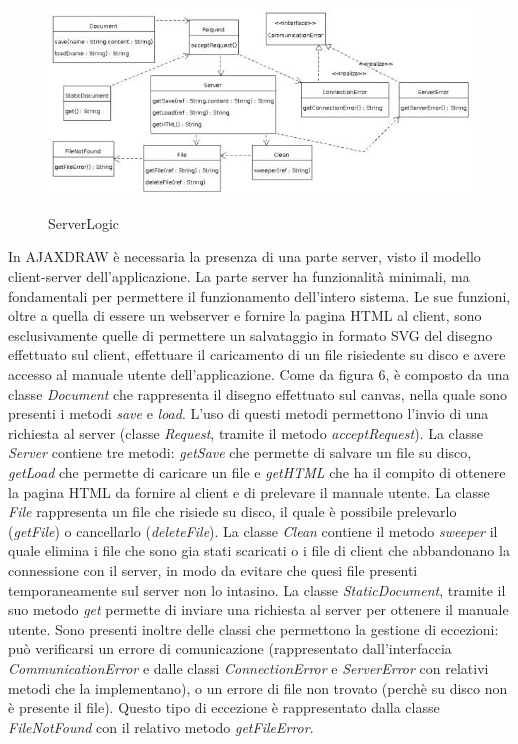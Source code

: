 \newpage
{}
\begin{figure}[!ht]
\centering
\includegraphics{ServerLogic.jpg}\\
\caption{ServerLogic}
\end{figure}

In AJAXDRAW \`e necessaria la presenza di una parte server, visto il modello client-server dell'applicazione. La parte server ha funzionalit\`a minimali, ma fondamentali per permettere il funzionamento dell'intero sistema. Le sue funzioni, oltre a quella di essere un webserver e fornire la pagina HTML al client, sono esclusivamente quelle di permettere un salvataggio in formato SVG del disegno effettuato sul client, effettuare il caricamento di un file risiedente su disco e avere accesso al manuale utente dell'applicazione. Come da figura 6, \`e composto da una classe \textit{Document} che rappresenta il disegno effettuato sul canvas, nella quale sono presenti i metodi \textit{save} e \textit{load}. L'uso di questi metodi permettono l'invio di una richiesta al server (classe \textit{Request}, tramite il metodo \textit{acceptRequest}). La classe \textit{Server} contiene tre metodi: \textit{getSave} che permette di salvare un file su disco, \textit{getLoad} che permette di caricare un file e \textit{getHTML} che ha il compito di ottenere la pagina HTML da fornire al client e di prelevare il manuale utente. La classe \textit{File} rappresenta un file che risiede su disco, il quale \`e possibile prelevarlo (\textit{getFile}) o cancellarlo (\textit{deleteFile}). La classe \textit{Clean} contiene il metodo \textit{sweeper} il quale elimina i file che sono gia stati scaricati o i file di client che abbandonano la connessione con il server, in modo da evitare che quesi file presenti temporaneamente sul server non lo intasino. La classe \textit{StaticDocument}, tramite il suo metodo \textit{get} permette di inviare una richiesta al server per ottenere il manuale utente. Sono presenti inoltre delle classi che permettono la gestione di eccezioni: pu\`o verificarsi un errore di comunicazione (rappresentato dall'interfaccia \textit{CommunicationError} e dalle classi \textit{ConnectionError} e \textit{ServerError} con relativi metodi che la implementano), o un errore di file non trovato (perch\`e su disco non \`e presente il file). Questo tipo di eccezione \`e rappresentato dalla classe \textit{FileNotFound} con il relativo metodo \textit{getFileError}. 


